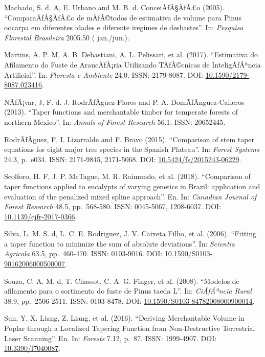 \documentclass[]{article}
\begin{document}
Machado, S. d. A, E. Urbano and M. B. d. ConceiÃƒÂ§ÃƒÂ£o (2005).
``ComparaÃƒÂ§ÃƒÂ£o de mÃƒÂ©todos de estimativa de volume para Pinus
oocarpa em diferentes idades e diferente iregimes de desbastes''. In:
\emph{Pesquisa Florestal Brasileira} 2005.50 ( jan./jun.).

Martins, A. P. M, A. B. Debastiani, A. L. Pelissari, et al. (2017).
``Estimativa do Afilamento do Fuste de AraucÃƒÂ¡ria Utilizando
TÃƒÂ©cnicas de InteligÃƒÂªncia Artificial''. In: \emph{Floresta e
Ambiente} 24.0. ISSN: 2179-8087. DOI:
\href{https://doi.org/10.1590/2179-8087.023416}{10.1590/2179-8087.023416}.

NÃƒÂ¡var, J, F. d. J. RodrÃƒÂ­guez-Flores and P. A.
DomÃƒÂ­nguez-Calleros (2013). ``Taper functions and merchantable timber
for temperate forests of northern Mexico''. In: \emph{Annals of Forest
Research} 56.1. ISSN: 20652445.

RodrÃƒÂ­guez, F, I. Lizarralde and F. Bravo (2015). ``Comparison of stem
taper equations for eight major tree species in the Spanish Plateau''.
In: \emph{Forest Systems} 24.3, p.~e034. ISSN: 2171-9845, 2171-5068.
DOI:
\href{https://doi.org/10.5424/fs/2015243-06229}{10.5424/fs/2015243-06229}.

Scolforo, H. F, J. P. McTague, M. R. Raimundo, et al. (2018).
``Comparison of taper functions applied to eucalypts of varying genetics
in Brazil: application and evaluation of the penalized mixed spline
approach''. En. In: \emph{Canadian Journal of Forest Research} 48.5,
pp.~568-580. ISSN: 0045-5067, 1208-6037. DOI:
\href{https://doi.org/10.1139/cjfr-2017-0366}{10.1139/cjfr-2017-0366}.

Silva, L. M. S. d, L. C. E. Rodriguez, J. V. Caixeta Filho, et al.
(2006). ``Fitting a taper function to minimize the sum of absolute
deviations''. In: \emph{Scientia Agricola} 63.5, pp.~460-470. ISSN:
0103-9016. DOI:
\href{https://doi.org/10.1590/S0103-90162006000500007}{10.1590/S0103-90162006000500007}.

Souza, C. A. M. d, T. Chassot, C. A. G. Finger, et al. (2008). ``Modelos
de afilamento para o sortimento do fuste de Pinus taeda L''. In:
\emph{CiÃƒÂªncia Rural} 38.9, pp.~2506-2511. ISSN: 0103-8478. DOI:
\href{https://doi.org/10.1590/S0103-84782008000900014}{10.1590/S0103-84782008000900014}.

Sun, Y, X. Liang, Z. Liang, et al. (2016). ``Deriving Merchantable
Volume in Poplar through a Localized Tapering Function from
Non-Destructive Terrestrial Laser Scanning''. En. In: \emph{Forests}
7.12, p.~87. ISSN: 1999-4907. DOI:
\href{https://doi.org/10.3390/f7040087}{10.3390/f7040087}.
\end{document}
